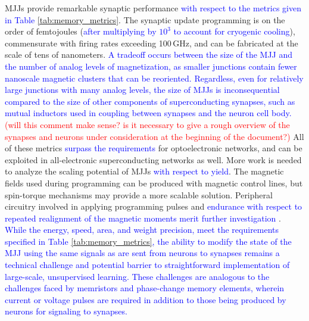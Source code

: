 \documentclass[twocolumn]{article}
\begin{document}
MJJs provide remarkable synaptic performance \textcolor{blue}{with respect to the metrics given in Table \ref{tab:memory_metrics}}. The synaptic update programming is on the order of femtojoules (\textcolor{blue}{after multiplying by $10^3$ to account for cryogenic cooling}), commensurate with firing rates exceeding 100\,GHz, and can be fabricated at the scale of tens of nanometers. \textcolor{blue}{A tradeoff occurs between the size of the MJJ and the number of analog levels of magnetization, as smaller junctions contain fewer nanoscale magnetic clusters that can be reoriented. Regardless, even for relatively large junctions with many analog levels, the size of  MJJs is inconsequential compared to the size of other components of superconducting synapses, such as mutual inductors used in coupling between synapses and the neuron cell body.} \textcolor{red}{(will this comment make sense? is it necessary to give a rough overview of the synapses and neurons under consideration at the beginning of the document?)} All of these metrics \textcolor{blue}{surpass the requirements} for optoelectronic networks, and can be exploited in all-electronic superconducting networks as well. More work is needed to analyze the scaling potential of MJJs \textcolor{blue}{with respect to yield}. The magnetic fields used during programming can be produced with magnetic control lines, but spin-torque mechanisms may provide a more scalable solution. Peripheral circuitry involved in applying programming pulses and \textcolor{blue}{endurance with respect to repeated realignment of the magnetic moments merit further investigation} \cite{schneider2018ultralow}. \textcolor{blue}{While the energy, speed, area, and weight precision, meet the requirements specified in Table \ref{tab:memory_metrics}, the ability to modify the state of the MJJ using the same signals as are sent from neurons to synapses remains a technical challenge and potential barrier to straightforward implementation of large-scale, unsupervised learning. These challenges are analogous to the challenges faced by memristors and phase-change memory elements, wherein current or voltage pulses are required in addition to those being produced by neurons for signaling to synapses.}
\end{document}
